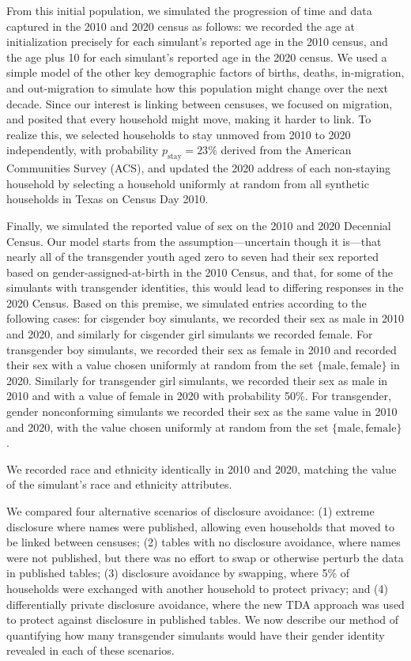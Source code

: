 \documentclass{jpc} %
\theoremstyle{plain}\newtheorem{satz}[thm]{Satz} %
\begin{document}
From this initial population, we simulated the progression of time and data captured in the 2010 and 2020 census as follows: we recorded the age at initialization precisely for each simulant's reported age in the 2010 census, and the age plus 10 for each simulant's reported age in the 2020 census.  We used a simple model of the other key demographic factors of births, deaths, in-migration, and out-migration to simulate how this population might change over the next decade. Since our interest is linking between censuses, we focused on migration, and posited that every household might move, making it harder to link. To realize this, we selected households to stay unmoved from 2010 to 2020 independently, with probability $p_{\text{stay}} = 23\%$ derived from the American Communities Survey (ACS), and updated the 2020 address of each non-staying household by selecting a household uniformly at random from all synthetic households in Texas on Census Day 2010.

Finally, we simulated the reported value of sex on the 2010 and 2020 Decennial Census. Our model starts from the assumption---uncertain though it is---that nearly all of the transgender youth aged zero to seven had their sex reported based on gender-assigned-at-birth in the 2010 Census, and that, for some of the simulants with transgender identities, this would lead to differing responses in the 2020 Census.
Based on this premise, we simulated entries according to the following cases: for cisgender boy simulants, we recorded their sex as male in 2010 and 2020, and similarly for cisgender girl simulants we recorded female.  For transgender boy simulants, we recorded their sex as female in 2010 and recorded their sex with a value chosen uniformly at random from the set $\{\text{male}, \text{female}\}$ in 2020.  Similarly for transgender girl simulants, we recorded their sex as male in 2010 and with a value of female in 2020 with probability 50\%.  For transgender, gender nonconforming simulants we recorded their sex as the same value in 2010 and 2020, with the value chosen uniformly at random from the set $\{\text{male}, \text{female}\}$.

We recorded race and ethnicity identically in 2010 and 2020, matching the value of the simulant's race and ethnicity attributes.

We compared four alternative scenarios of disclosure avoidance: (1) extreme disclosure where names were published, allowing even households that moved to be linked between censuses; (2) tables with no disclosure avoidance, where names were not published, but there was no effort to swap or otherwise perturb the data in published tables; (3) disclosure avoidance by swapping, where 5\% of households were exchanged with another household to protect privacy; and (4) differentially private disclosure avoidance, where the new TDA approach was used to protect against disclosure in published tables.  We now describe our method of quantifying how many transgender simulants would have their gender identity revealed in each of these scenarios.
\end{document}
